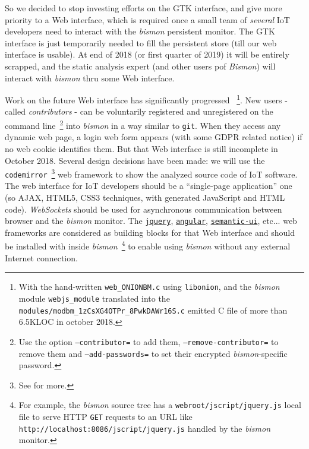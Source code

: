 So we decided to stop investing efforts on the GTK interface, and give
more priority to a Web interface, which is required once a small team
of \emph{several} IoT developers need to interact with the
\emph{bismon} persistent monitor. The GTK interface is just
temporarily needed to fill the persistent store (till our web
interface is usable). At end of 2018 (or first quarter of 2019) it
will be entirely scrapped, and the static analysis expert (and other
users pof \emph{Bismon}) will interact with \emph{bismon} thru some
Web interface.

Work on the future Web interface has significantly progressed
~\footnote{With the hand-written \texttt{web\_ONIONBM.c} using
  \texttt{libonion}, and the \emph{bismon} module
  \texttt{webjs\_module} translated into the
  \texttt{modules/modbm\_1zCsXG4OTPr\_8PwkDAWr16S.c} emitted C file of
  more than 6.5KLOC in october 2018.}. New users -called
\emph{contributors} - can be voluntarily registered
and unregistered on the command line~\footnote{Use the option
  \texttt{--contributor=} to add them, \texttt{--remove-contributor=}
  to remove them and \texttt{--add-passwords=} to set their encrypted
  \emph{bismon}-specific password.} into \emph{bismon} in a way
similar to \texttt{git}. When they access any dynamic web page, a
login web form appears (with some GDPR  related notice) if
no web cookie identifies them. But that Web interface is still
incomplete in October 2018. Several design decisions have been made:
we will use the \texttt{codemirror}~\footnote{See
   for more.} web framework to show the
analyzed source code of IoT software. The web interface for IoT
developers should be a ``single-page application'' one (so AJAX,
HTML5, CSS3 techniques, with generated JavaScript and HTML
code). \emph{WebSockets} should be used for asynchronous communication
between browser and the \emph{bismon} monitor. The
\href{http://jquery.com/}{\texttt{jquery}},
\href{https://angular.io/}{\texttt{angular}},
\href{https://semantic-ui.com/}{\texttt{semantic-ui}}, etc... web
frameworks are considered as building blocks for that Web interface
and should be installed with inside \emph{bismon}~\footnote{For
  example, the \emph{bismon} source tree has a
  \texttt{webroot/jscript/jquery.js} local file to serve HTTP
  \texttt{GET} requests to an URL like
  \texttt{http://localhost:8086/jscript/jquery.js} handled by the
  \emph{bismon} monitor.} to enable using \emph{bismon} without any
external Internet connection.


